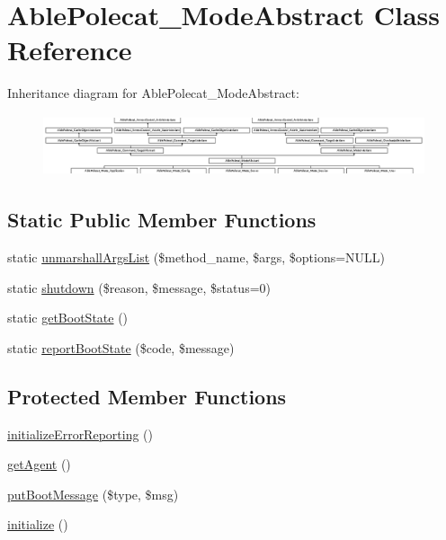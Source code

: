 \hypertarget{class_able_polecat___mode_abstract}{}\section{Able\+Polecat\+\_\+\+Mode\+Abstract Class Reference}
\label{class_able_polecat___mode_abstract}
Inheritance diagram for Able\+Polecat\+\_\+\+Mode\+Abstract\+:\begin{figure}[H]
\begin{center}
\leavevmode
\includegraphics[height=1.806452cm]{class_able_polecat___mode_abstract}
\end{center}
\end{figure}
\subsection*{Static Public Member Functions}
\begin{DoxyCompactItemize}
\item 
static \hyperlink{class_able_polecat___mode_abstract_a94d2e558bba777f54dcc10f1bfc4dca5}{unmarshall\+Args\+List} (\$method\+\_\+name, \$args, \$options=N\+U\+L\+L)
\item 
static \hyperlink{class_able_polecat___mode_abstract_a55c20682b992aa8250b1d03f03f58385}{shutdown} (\$reason, \$message, \$status=0)
\item 
static \hyperlink{class_able_polecat___mode_abstract_a97d13ab5b7a6a28f4e248e9ab558113c}{get\+Boot\+State} ()
\item 
static \hyperlink{class_able_polecat___mode_abstract_a77f8a9bbe00fdd79a91f27268c88a7dd}{report\+Boot\+State} (\$code, \$message)
\end{DoxyCompactItemize}
\subsection*{Protected Member Functions}
\begin{DoxyCompactItemize}
\item 
\hyperlink{class_able_polecat___mode_abstract_a1edabbfbec5258ee9df5fc2f236f51b4}{initialize\+Error\+Reporting} ()
\item 
\hyperlink{class_able_polecat___mode_abstract_a14f9546bbf5895db0fe37673bab21850}{get\+Agent} ()
\item 
\hyperlink{class_able_polecat___mode_abstract_af811bf4cbcf41c821f1e1d2e80908ed1}{put\+Boot\+Message} (\$type, \$msg)
\item 
\hyperlink{class_able_polecat___mode_abstract_a91098fa7d1917ce4833f284bbef12627}{initialize} ()
\end{DoxyCompactItemize}
